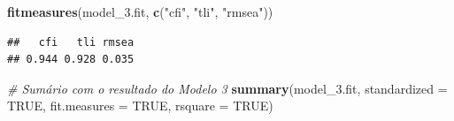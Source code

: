 \documentclass[
  12pt,
]{article}
\newenvironment{Shaded}{\begin{snugshade}}{\end{snugshade}}
\newcommand{\CommentTok}[1]{\textcolor[rgb]{0.56,0.35,0.01}{\textit{#1}}}
\newcommand{\DataTypeTok}[1]{\textcolor[rgb]{0.13,0.29,0.53}{#1}}
\newcommand{\FloatTok}[1]{\textcolor[rgb]{0.00,0.00,0.81}{#1}}
\newcommand{\KeywordTok}[1]{\textcolor[rgb]{0.13,0.29,0.53}{\textbf{#1}}}
\newcommand{\NormalTok}[1]{#1}
\newcommand{\OtherTok}[1]{\textcolor[rgb]{0.56,0.35,0.01}{#1}}
\newcommand{\StringTok}[1]{\textcolor[rgb]{0.31,0.60,0.02}{#1}}
\begin{document}
\begin{Shaded}
\begin{Highlighting}[]
\KeywordTok{fitmeasures}\NormalTok{(model\_}\FloatTok{3.}\NormalTok{fit, }\KeywordTok{c}\NormalTok{(}\StringTok{"cfi"}\NormalTok{, }\StringTok{"tli"}\NormalTok{, }\StringTok{"rmsea"}\NormalTok{))}
\end{Highlighting}
\end{Shaded}

\begin{verbatim}
##   cfi   tli rmsea 
## 0.944 0.928 0.035
\end{verbatim}

\begin{Shaded}
\begin{Highlighting}[]
\CommentTok{\# Sumário com o resultado do Modelo 3}
\KeywordTok{summary}\NormalTok{(model\_}\FloatTok{3.}\NormalTok{fit,}
\DataTypeTok{standardized =} \OtherTok{TRUE}\NormalTok{,}
\DataTypeTok{fit.measures =} \OtherTok{TRUE}\NormalTok{,}
\DataTypeTok{rsquare =} \OtherTok{TRUE}\NormalTok{)}
\end{Highlighting}
\end{Shaded}
\end{document}
